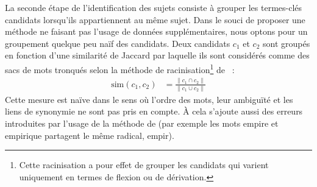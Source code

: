     La seconde étape de l'identification des sujets consiste à grouper les
    termes-clés candidats lorsqu'ils appartiennent au même sujet. Dans le souci
    de proposer une méthode ne faisant pas l'usage de données supplémentaires,
    nous optons pour un groupement quelque peu naïf des candidats. Deux
    candidats $c_1$ et $c_2$ sont groupés en fonction d'une similarité de
    Jaccard par laquelle ils sont considérés comme des sacs de mots tronqués
    selon la méthode de racinisation\footnote{Cette racinisation a pour effet de
    grouper les candidats qui varient uniquement en termes de flexion ou de
    dérivation.} de ~:
    \begin{align}
      \text{sim}(c_1, c_2) &= \frac{\|c_1 \cap c_2\|}{\|c_1 \cup c_2\|} \label{equa:jaccard}
    \end{align}
    Cette mesure est naïve dans le sens où l'ordre des mots, leur ambiguïté et
    les liens de synonymie ne sont pas pris en compte. À cela s'ajoute aussi des
    erreurs introduites par l'usage de la méthode de
     (par exemple les mots \og{}empire\fg{} et
    \og{}empirique\fg{} partagent le même radical, \og{}empir\fg{}).

